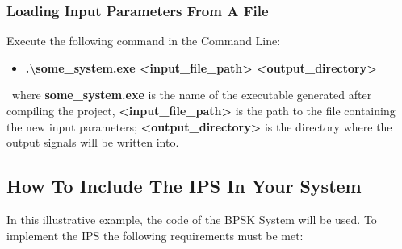 \subsubsection{Loading Input Parameters From A File}
Execute the following command in the Command Line:
\begin{itemize}
  \item[] \textbf{.\textbackslash{}some\_system.exe <input\_file\_path> <output\_directory>}
\end{itemize}
\
where \textbf{some\_system.exe} is the name of the executable generated after compiling the project, \textbf{<input\_file\_path>} is the path to the file containing the new input parameters; \textbf{<output\_directory>} is the directory where the output signals will be written into.

\subsection{How To Include The IPS In Your System}
In this illustrative example, the code of the BPSK System will be used. To implement the IPS the following requirements must be met:
